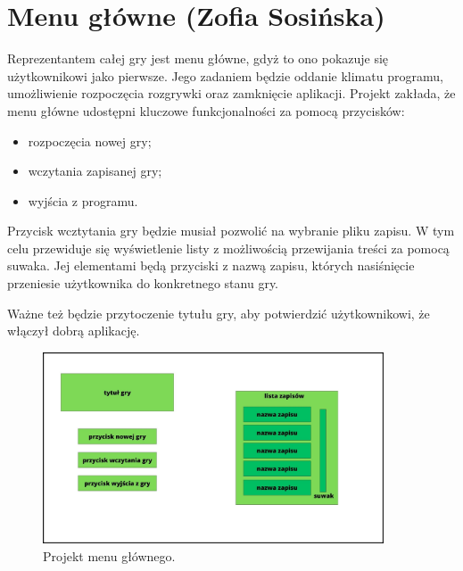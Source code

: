 \section{Menu główne (Zofia Sosińska)}\label{chap:menu_main}
Reprezentantem całej gry jest menu główne, gdyż to ono pokazuje się użytkownikowi jako pierwsze. Jego zadaniem będzie oddanie klimatu programu,
 umożliwienie rozpoczęcia rozgrywki oraz zamknięcie aplikacji.
Projekt zakłada, że menu główne udostępni kluczowe funkcjonalności za pomocą przycisków:
\begin{itemize}
    \item rozpoczęcia nowej gry;
    \item wczytania zapisanej gry;
    \item wyjścia z programu.
\end{itemize}

Przycisk wcztytania gry będzie musiał pozwolić na wybranie pliku zapisu. W tym celu przewiduje się wyświetlenie listy
z możliwością przewijania treści za pomocą suwaka. Jej elementami będą przyciski z nazwą zapisu, których nasiśnięcie przeniesie 
użytkownika do konkretnego stanu gry.

Ważne też będzie przytoczenie tytułu gry, aby potwierdzić użytkownikowi, że włączył dobrą aplikację.
\begin{figure}[htbp]
    \centering
    \includegraphics[width=0.9\textwidth]{images/ui/ui_prooj_menu.jpg}
    \caption{Projekt menu głównego.
    }\label{fig:compass}
\end{figure}